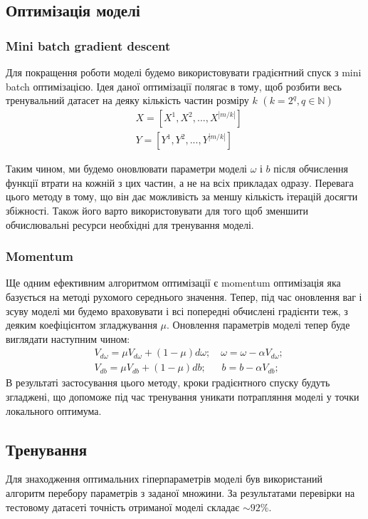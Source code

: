 \documentclass[a4paper,14pt]{extreport}
\begin{document}
	\subsection{Оптимізація моделі}
	\subsubsection{Mini batch gradient descent}
	\noindent
	Для покращення роботи моделі будемо використовувати градієнтний спуск з mini batch  оптимізацією. Ідея даної оптимізації полягає в тому, щоб розбити весь тренувальний датасет на деяку кількість частин розміру $k$ $(k=2^{q}, q \in  \mathbb{N})$
	\begin{align*}
	&X = [X^{1}, X^{2}, ..., X^{|m/k|}]\\
	&Y = [Y^{1}, Y^{2}, ..., Y^{|m/k|}]
	\end{align*}
	
	Таким чином, ми будемо оновлювати параметри моделі $\omega$ і $b$ після обчислення функції втрати на кожній з цих частин, а не на всіх прикладах одразу. Перевага цього методу в тому, що він дає можливість за меншу кількість ітерацій досягти збіжності. Також його варто використовувати для того щоб зменшити обчислювальні ресурси необхідні для тренування моделі.

	\subsubsection{Momentum}
	\noindent
	Ще одним ефективним алгоритмом оптимізації є momentum оптимізація яка базується на методі рухомого середнього значення. Тепер, під час оновлення ваг і зсуву моделі ми будемо враховувати і всі попередні обчислені градієнти теж, з деяким коефіцієнтом згладжування $\mu$. Оновлення параметрів моделі тепер буде виглядати наступним чином:
	\begin{align*}
		&V_{d\omega} = \mu V_{d\omega} + (1 - \mu) d\omega; \quad 
		\omega = \omega - \alpha V_{d\omega}; \\
		&V_{db} = \mu V_{db} + (1 - \mu) db; \; \; \quad
		b= b - \alpha V_{db}; 
	\end{align*}
	В результаті застосування цього методу, кроки градієнтного спуску будуть згладжені, що допоможе під час тренування уникати потрапляння моделі у точки локального оптимума.
	
	\subsection{Тренування}
	Для знаходження оптимальних гіперпараметрів моделі був використаний алгоритм перебору параметрів з заданої множини. За результатами перевірки на тестовому датасеті точність отриманої моделі складає $\sim 92\%$.
	
\end{document}
